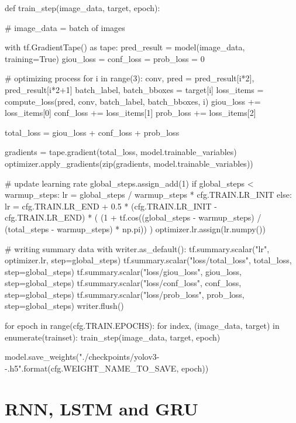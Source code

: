 \documentclass[10pt,a4paper]{article}
\begin{document}
\begin{py}
def train_step(image_data, target, epoch):

    # image_data = batch of images

    with tf.GradientTape() as tape:
        pred_result = model(image_data, training=True)
        giou_loss = conf_loss = prob_loss = 0

        # optimizing process
        for i in range(3):
            conv, pred = pred_result[i*2], pred_result[i*2+1]
            batch_label, batch_bboxes = target[i]
            loss_items = compute_loss(pred, conv, batch_label, batch_bboxes, i)
            giou_loss += loss_items[0]
            conf_loss += loss_items[1]
            prob_loss += loss_items[2]

        total_loss = giou_loss + conf_loss + prob_loss

        gradients = tape.gradient(total_loss, model.trainable_variables)
        optimizer.apply_gradients(zip(gradients, model.trainable_variables))

        # update learning rate
        global_steps.assign_add(1)
        if global_steps < warmup_steps:
            lr = global_steps / warmup_steps * cfg.TRAIN.LR_INIT
        else:
            lr = cfg.TRAIN.LR_END + 0.5 * (cfg.TRAIN.LR_INIT - cfg.TRAIN.LR_END) * (
                (1 + tf.cos((global_steps - warmup_steps) / (total_steps - warmup_steps) * np.pi))
            )
        optimizer.lr.assign(lr.numpy())

        # writing summary data
        with writer.as_default():
            tf.summary.scalar("lr", optimizer.lr, step=global_steps)
            tf.summary.scalar("loss/total_loss", total_loss, step=global_steps)
            tf.summary.scalar("loss/giou_loss", giou_loss, step=global_steps)
            tf.summary.scalar("loss/conf_loss", conf_loss, step=global_steps)
            tf.summary.scalar("loss/prob_loss", prob_loss, step=global_steps)
        writer.flush()

for epoch in range(cfg.TRAIN.EPOCHS):
    for index, (image_data, target) in enumerate(trainset):
        train_step(image_data, target, epoch)

    model.save_weights("./checkpoints/yolov3-{}-{}.h5".format(cfg.WEIGHT_NAME_TO_SAVE, epoch))
\end{py}




\section{RNN, LSTM and GRU}
\end{document}
